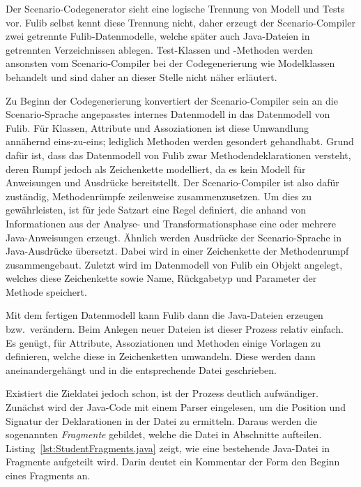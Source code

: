 Der Scenario-Codegenerator sieht eine logische Trennung von Modell und Tests vor.
Fulib selbst kennt diese Trennung nicht, daher erzeugt der Scenario-Compiler zwei getrennte Fulib-Datenmodelle, welche später auch Java-Dateien in getrennten Verzeichnissen ablegen.
Test-Klassen und -Methoden werden ansonsten vom Scenario-Compiler bei der Codegenerierung wie Modelklassen behandelt und sind daher an dieser Stelle nicht näher erläutert.

Zu Beginn der Codegenerierung konvertiert der Scenario-Compiler sein an die Scenario-Sprache angepasstes internes Datenmodell in das Datenmodell von Fulib.
Für Klassen, Attribute und Assoziationen ist diese Umwandlung annähernd eins-zu-eins;
lediglich Methoden werden gesondert gehandhabt.
Grund dafür ist, dass das Datenmodell von Fulib zwar Methodendeklarationen versteht, deren Rumpf jedoch als Zeichenkette modelliert, da es kein Modell für Anweisungen und Ausdrücke bereitstellt.
Der Scenario-Compiler ist also dafür zuständig, Methodenrümpfe zeilenweise zusammenzusetzen.
Um dies zu gewährleisten, ist für jede Satzart eine Regel definiert, die anhand von Informationen aus der Analyse- und Transformationsphase eine oder mehrere Java-Anweisungen erzeugt.
Ähnlich werden Ausdrücke der Scenario-Sprache in Java-Ausdrücke übersetzt.
Dabei wird in einer Zeichenkette der Methodenrumpf zusammengebaut.
Zuletzt wird im Datenmodell von Fulib ein Objekt angelegt, welches diese Zeichenkette sowie Name, Rückgabetyp und Parameter der Methode speichert.

Mit dem fertigen Datenmodell kann Fulib dann die Java-Dateien erzeugen bzw.\ verändern.
Beim Anlegen neuer Dateien ist dieser Prozess relativ einfach.
Es genügt, für Attribute, Assoziationen und Methoden einige Vorlagen zu definieren, welche diese in Zeichenketten umwandeln.
Diese werden dann aneinandergehängt und in die entsprechende Datei geschrieben.

Existiert die Zieldatei jedoch schon, ist der Prozess deutlich aufwändiger.
Zunächst wird der Java-Code mit einem Parser eingelesen, um die Position und Signatur der Deklarationen in der Datei zu ermitteln.
Daraus werden die sogenannten \emph{Fragmente} gebildet, welche die Datei in Abschnitte aufteilen.
Listing~\ref{lst:StudentFragments.java} zeigt, wie eine bestehende Java-Datei in Fragmente aufgeteilt wird.
Darin deutet ein Kommentar der Form  den Beginn eines Fragments an.

